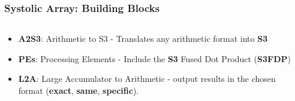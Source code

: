 %
%
%
\begin{frame}
    \frametitle{Systolic Array: Building Blocks}

    \begin{columns}
        \begin{column}{0.45\textwidth}
            \begin{itemize}
		    \item<1->\textbf{A2S3}: Arithmetic to S3 - Translates any arithmetic format into \textbf{S3}
		    \item<2->\textbf{PEs}: Processing Elements - Include the \textbf{S3} Fused Dot Product (\textbf{S3FDP})
		    \item<3->\textbf{L2A}: Large Accumulator to Arithmetic - output results in the chosen format (\textbf{exact}, \textbf{same}, \textbf{specific}).
            \end{itemize}
        \end{column}

        \begin{column}{0.55\textwidth}
            \centering
        \end{column}
    \end{columns}

\end{frame}

